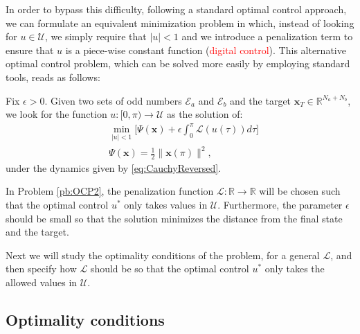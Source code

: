In order to bypass this difficulty, following a standard optimal control approach, we can formulate an equivalent minimization problem in which, instead of looking for $u\in\mathcal U$, we simply require that $|u|<1$ and we introduce a penalization term to ensure that $u$ is a piece-wise constant function (\textcolor{red}{digital control}). This alternative optimal control problem, which can be solved more easily by employing standard tools, reads as follows:
\newline
\begin{problem}\label{pb:OCP2}
Fix $\epsilon>0$. Given two sets of odd numbers $\mathcal E_a $ and $\mathcal E_b $ and the target $\bm{x}_T \in \mathbb {R}^{N_a + N_b}$, we look for the  function $u:[0,\pi)\to\mathcal U$ as the solution of:
\begin{align*}
	&\min_{|u|<1} \Bigg[\Psi(\bm{x}) + \epsilon \int_0^{\pi} \mathcal{L}(u(\tau)) d\tau \Bigg]  
	\\[5pt]
	&\Psi(\bm{x}) = \frac 12 \|\bm{x}(\pi) \|^2,
\end{align*}
under the dynamics given by \eqref{eq:CauchyReversed}.
\end{problem}

In Problem \ref{pb:OCP2}, the penalization function $\mathcal L: \mathbb{R} \rightarrow \mathbb{R}$ will be chosen such that the optimal control $u^*$ only takes values in $\mathcal U$. Furthermore, the parameter $\epsilon$ should be small so that the solution minimizes the distance from the final state and the target.

Next we will study the optimality conditions of the problem, for a general $\mathcal L$, and then specify how $\mathcal L$ should be so that the optimal control $u^*$ only takes the allowed values in $\mathcal U$.

\subsection{Optimality conditions}

